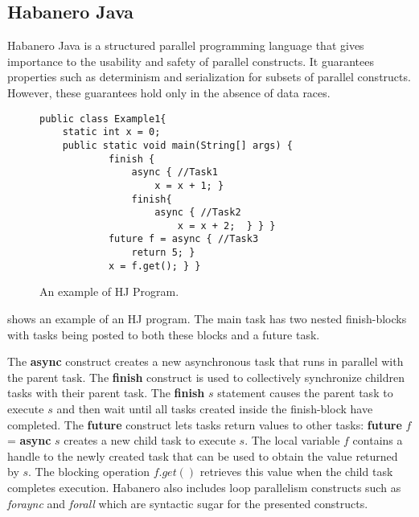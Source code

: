 \subsection{Habanero Java}
Habanero Java is a structured parallel programming language that gives importance to the usability and safety of parallel constructs. It guarantees properties such as determinism and serialization for subsets of parallel constructs. However, these guarantees hold only in the absence of data races.

\begin{figure}
  \begin{center}
    \begin{lstlisting}
public class Example1{
	static int x = 0;
	public static void main(String[] args) {
			finish {
				async { //Task1
					x = x + 1; }
				finish{
					async { //Task2
						x = x + 2;  } } }
			future f = async { //Task3
				return 5; }
			x = f.get(); } }
\end{lstlisting}
  \end{center}
  \vspace{-2em}
  \caption{An example of HJ Program.}
  \label{fig:hj-async-fin}
\end{figure}

 shows an example of an HJ program. The main task has two nested finish-blocks with tasks being posted to both these blocks and a future task.

The \textbf{async} construct creates a new asynchronous task that runs in parallel with the parent task. The \textbf{finish} construct is used to collectively synchronize children tasks with their parent task. The \textbf{finish} $s$ statement causes the parent task to execute $s$ and then wait until all tasks created inside the finish-block have completed. The \textbf{future} construct lets tasks return values to other tasks: \textbf{future} $f$ = \textbf{async} $s$ creates a new child task to execute $s$. The local variable $f$ contains a handle to the newly created task that can be used to obtain the value returned by $s$. The blocking operation $f.get()$ retrieves this value when the child task completes execution. Habanero also includes loop parallelism constructs such as \emph{foraync} and \emph{forall} which are syntactic sugar for the presented constructs. 

